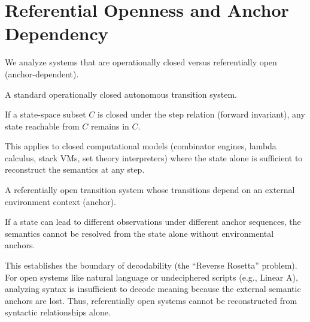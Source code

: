 \section{Referential Openness and Anchor Dependency}

We analyze systems that are operationally closed versus referentially open (anchor-dependent).

\begin{definition}
A standard operationally closed autonomous transition system.
\end{definition}

\begin{theorem}
If a state-space subset $C$ is closed under the step relation (forward invariant), any state reachable from $C$ remains in $C$.
\end{theorem}

This applies to closed computational models (combinator engines, lambda calculus, stack VMs, set theory interpreters) where the state alone is sufficient to reconstruct the semantics at any step.

\begin{definition}
A referentially open transition system whose transitions depend on an external environment context (anchor).
\end{definition}

\begin{theorem}
If a state can lead to different observations under different anchor sequences, the semantics cannot be resolved from the state alone without environmental anchors.
\end{theorem}

This establishes the boundary of decodability (the ``Reverse Rosetta'' problem). For open systems like natural language or undeciphered scripts (e.g., Linear A), analyzing syntax is insufficient to decode meaning because the external semantic anchors are lost. Thus, referentially open systems cannot be reconstructed from syntactic relationships alone.
